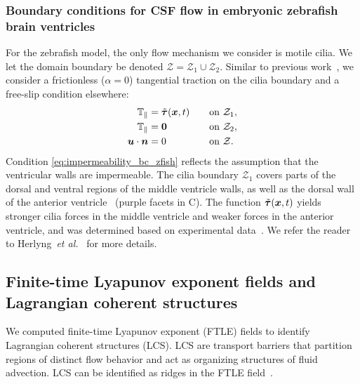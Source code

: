 \documentclass{template}
\begin{document}
\subsubsection{Boundary conditions for CSF flow in embryonic zebrafish brain ventricles}
\label{sec:boundary_conditions_zfish}
For the zebrafish model, the only flow mechanism
we consider is motile cilia. We let the domain boundary be denoted
$\mathcal{Z} = \mathcal{Z}_1\cup\mathcal{Z}_2$.
Similar to previous work~\citep{Herlyng2025AdvectionDiffusion},
we consider a frictionless ($\alpha=0$) 
tangential traction on the cilia boundary
and a free-slip condition elsewhere:
\begin{alignat}{2}
    \mathbb{T}_{\parallel} &= \Tilde{\bm{\tau}}(\bm{x}, t)  &&\quad\text{on }\mathcal{Z}_1, \\
    \mathbb{T}_{\parallel} &= \bm{0} &&\quad\text{on }\mathcal{Z}_2, \\
    \bm{u}\cdot\bm{n} &= 0 &&\quad\text{on }\mathcal{Z}.\label{eq:impermeability_bc_zfish}
\end{alignat}
Condition \eqref{eq:impermeability_bc_zfish} reflects the assumption that the
ventricular walls are impermeable. The cilia
boundary $\mathcal{Z}_1$ covers parts of the dorsal and ventral
regions of the middle ventricle walls, as well as the dorsal wall of the anterior
ventricle~\citep{Olstad2019CiliaryDevelopment} (purple facets in C).
The function $\Tilde{\bm{\tau}}(\bm{x}, t)$ yields stronger cilia forces in the middle ventricle
and weaker forces in the anterior ventricle, and was determined based on
experimental data~\citep{Olstad2019CiliaryDevelopment}. We refer the reader to
Herlyng~\emph{et al.}~\citep{Herlyng2025AdvectionDiffusion} for more details.

\subsection{Finite-time Lyapunov exponent fields and Lagrangian coherent structures}
We computed finite-time Lyapunov exponent (FTLE) fields to
identify Lagrangian coherent structures (LCS).
LCS are transport barriers that partition regions of distinct flow behavior
and act as organizing structures of fluid advection.
LCS can be identified as ridges in the FTLE field~\citep{shadden2005definition}. 
\end{document}
